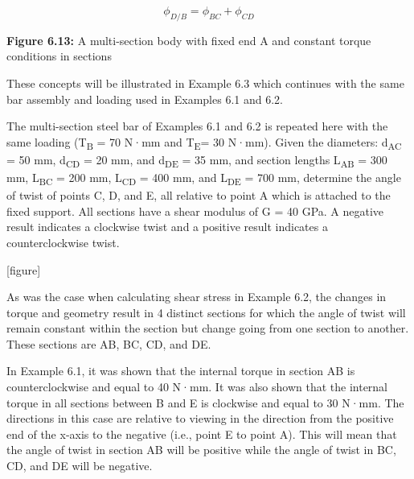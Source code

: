 \documentclass[
  letterpaper,
  DIV=11,
  numbers=noendperiod]{scrreprt}
\theoremstyle{definition}
\theoremstyle{remark}
\begin{document}
\[
\phi_{D / B}=\phi_{B C}+\phi_{C D}
\]

\textbf{Figure 6.13:} A multi-section body with fixed end A and constant
torque conditions in sections

These concepts will be illustrated in Example 6.3 which continues with
the same bar assembly and loading used in Examples 6.1 and 6.2.

\begin{tcolorbox}[enhanced jigsaw, leftrule=.75mm, colbacktitle=quarto-callout-tip-color!10!white, breakable, opacityback=0, colback=white, titlerule=0mm, toprule=.15mm, colframe=quarto-callout-tip-color-frame, coltitle=black, title={Example 6.3}, toptitle=1mm, bottomrule=.15mm, rightrule=.15mm, left=2mm, arc=.35mm, opacitybacktitle=0.6, bottomtitle=1mm]

The multi-section steel bar of Examples 6.1 and 6.2 is repeated here
with the same loading (T\textsubscript{B} = 70 N·mm and
T\textsubscript{E}= 30 N·mm). Given the diameters: d\textsubscript{AC} =
50 mm, d\textsubscript{CD} = 20 mm, and d\textsubscript{DE} = 35 mm, and
section lengths L\textsubscript{AB} = 300 mm, L\textsubscript{BC} = 200
mm, L\textsubscript{CD} = 400 mm, and L\textsubscript{DE} = 700 mm,
determine the angle of twist of points C, D, and E, all relative to
point A which is attached to the fixed support. All sections have a
shear modulus of G = 40 GPa. A negative result indicates a clockwise
twist and a positive result indicates a counterclockwise twist.

{[}figure{]}

\begin{tcolorbox}[enhanced jigsaw, leftrule=.75mm, colbacktitle=quarto-callout-tip-color!10!white, breakable, opacityback=0, colback=white, titlerule=0mm, toprule=.15mm, colframe=quarto-callout-tip-color-frame, coltitle=black, title={Solution}, toptitle=1mm, bottomrule=.15mm, rightrule=.15mm, left=2mm, arc=.35mm, opacitybacktitle=0.6, bottomtitle=1mm]

As was the case when calculating shear stress in Example 6.2, the
changes in torque and geometry result in 4 distinct sections for which
the angle of twist will remain constant within the section but change
going from one section to another. These sections are AB, BC, CD, and
DE.

In Example 6.1, it was shown that the internal torque in section AB is
counterclockwise and equal to 40 N·mm. It was also shown that the
internal torque in all sections between B and E is clockwise and equal
to 30 N·mm. The directions in this case are relative to viewing in the
direction from the positive end of the x-axis to the negative (i.e.,
point E to point A). This will mean that the angle of twist in section
AB will be positive while the angle of twist in BC, CD, and DE will be
negative.


\end{tcolorbox}
\end{tcolorbox}
\end{document}
